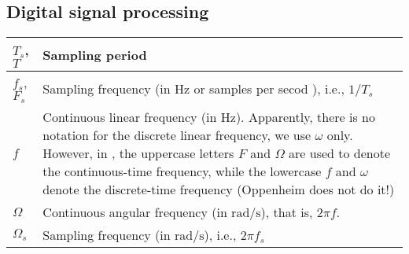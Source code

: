 \subsection{Digital signal processing}
\begin{xltabular}{\textwidth}{XX}
	\(T_s\)\cite{ingleDigitalSignalProcessing2000}, \(T\)\cite{oppenheimDiscreteTimeSignalProcessing2009}                                  & Sampling period                                                                                                                                                                                             \\ \hline
	\(f_s\), \(F_s\)\cite{ingleDigitalSignalProcessing2000}                                                                                         & Sampling frequency (in \(\si{\hertz}\) or samples per secod \cite[chapter 3]{ingleDigitalSignalProcessing2000}), i.e., \(1/T_s\)                                                                                                                                                      \\ \hline
	\(f\)                                                                                         & Continuous linear frequency (in \(\si{\hertz}\)). Apparently, there is no notation for the discrete linear frequency, we use \(\omega\) only. However, in \cite{ingleDigitalSignalProcessing2000}, the uppercase letters \(F\) and \(\Omega\) are used to denote the continuous-time frequency, while the lowercase \(f\) and \(\omega\) denote the discrete-time frequency (Oppenheim \cite{oppenheimDiscreteTimeSignalProcessing2009} does not do it!)                                                                                                                                                             \\ \hline
	\(\Omega\) \cite{ingleDigitalSignalProcessing2000}                                              & Continuous angular frequency (in \(\si{\radian\per\second}\)), that is, \(2\pi f\).                                                                                                                                               \\ \hline
	\(\Omega_s\)                                                                                    & Sampling frequency (in \(\si{\radian\per\second}\)), i.e., \(2\pi f_s\)                                                                                                                                     \\ \hline

\end{xltabular}
